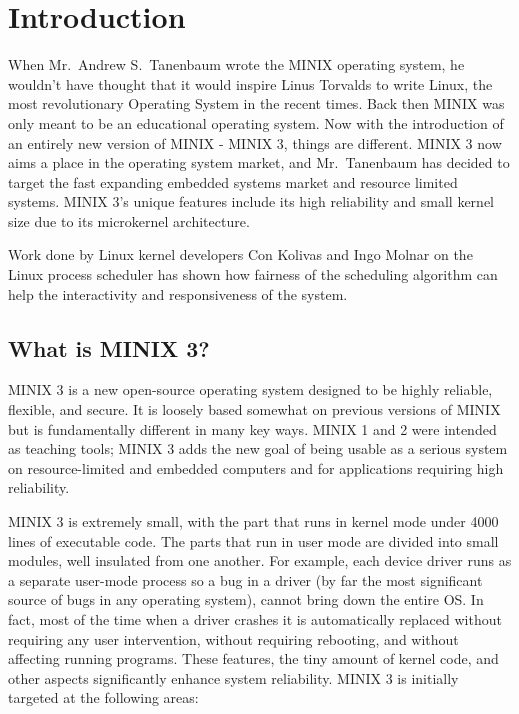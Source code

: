 \chapter{Introduction}

When Mr.~Andrew S.~Tanenbaum wrote the MINIX operating system, he wouldn't have thought that it would inspire 
Linus Torvalds to write Linux, the most revolutionary Operating System in the recent times. Back then MINIX was only meant to be an educational operating system. Now with the introduction of an entirely new version of MINIX - MINIX 3, things are different.
MINIX 3 now aims a place in the operating system market, and Mr.~Tanenbaum has decided to target the fast expanding embedded systems market and resource limited systems. MINIX 3's unique features include its high 
reliability and small kernel size due to its microkernel architecture.

Work done by Linux kernel developers Con Kolivas and Ingo Molnar on the Linux process scheduler has shown
how fairness of the scheduling algorithm can help the interactivity and responsiveness of the system.

\section{What is MINIX 3?}

MINIX 3 is a new open-source operating system designed to be highly reliable, flexible, and secure. 
It is loosely based somewhat on previous versions of MINIX but is fundamentally different in many key ways. 
MINIX 1 and 2 were intended as teaching tools; MINIX 3 adds the new goal of being usable as a serious 
system on resource-limited and embedded computers and for applications requiring high reliability.

MINIX 3 is extremely small, with the part that runs in kernel mode under 4000 lines of executable code. 
The parts that run in user mode are divided into small modules, well insulated from one another. 
For example, each device driver runs as a separate user-mode process so a bug in a driver 
(by far the most significant source of bugs in any operating system), cannot bring down the entire OS. 
In fact, most of the time when a driver crashes it is automatically replaced without requiring any user intervention, without requiring rebooting, and without affecting running programs. 
These features, the tiny amount of kernel code, and other aspects significantly enhance system reliability.
MINIX 3 is initially targeted at the following areas:

